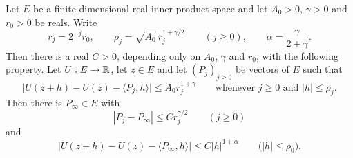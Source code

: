 \begin{lemma}
Let $E$ be a finite-dimensional real inner-product space and let $A_0>0$,
$\gamma>0$ and $r_0>0$ be reals. Write
\[
  r_j=2^{-j}r_0,\qquad \rho_j=\sqrt{A_0}\,r_j^{1+\gamma/2}\qquad(j\ge0),
  \qquad \alpha=\frac{\gamma}{2+\gamma}.
\]
Then there is a real $C>0$, depending only on $A_0$, $\gamma$ and $r_0$, with the
following property. Let $U:E\to\mathbb{R}$, let $z\in E$ and let $(P_j)_{j\ge0}$ be
vectors of $E$ such that
\begin{equation}\label{eq:dfte-fit}
  \bigl|U(z+h)-U(z)-\langle P_j,h\rangle\bigr|\le A_0r_j^{1+\gamma}
  \qquad\text{whenever }j\ge0\text{ and }|h|\le\rho_j .
\end{equation}
Then there is $P_\infty\in E$ with
\[
  |P_j-P_\infty|\le Cr_j^{\gamma/2}\qquad(j\ge0)
\]
and
\[
  \bigl|U(z+h)-U(z)-\langle P_\infty,h\rangle\bigr|\le C|h|^{1+\alpha}
  \qquad\bigl(|h|\le\rho_0\bigr).
\]
\end{lemma}
